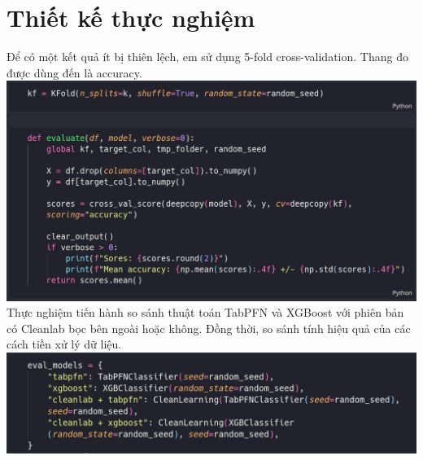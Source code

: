 \section {Thiết kế thực nghiệm}
Để có một kết quả ít bị thiên lệch, em sử dụng 5-fold cross-validation.
Thang đo được dùng đến là accuracy.
\includegraphics[width=\linewidth]{img/cross_val.jpeg}
Thực nghiệm tiến hành so sánh thuật toán TabPFN \cite{hollmann2023tabpfn} và XGBoost \cite{Chen2016} với phiên bản có Cleanlab \cite{northcutt2021confidentlearning} bọc bên ngoài hoặc không. Đồng thời, so sánh tính hiệu quả của các cách tiền xử lý dữ liệu.
\includegraphics[width=\linewidth]{img/models.jpeg}

